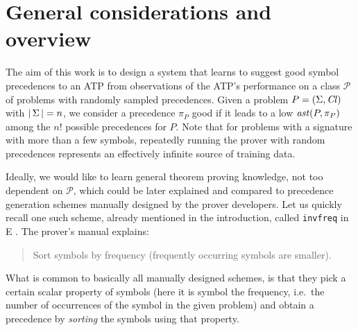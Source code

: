 


\section{General considerations and overview} \label{sect:overview}

The aim of this work is to design a system that learns to suggest good symbol precedences to an ATP 
from observations of the ATP's performance on a class \(\mathcal{P}\) of problems with randomly sampled precedences. 
Given a problem \(P = (\operatorname{\Sigma},\operatorname{\mathit{Cl}})\) with \(|\operatorname{\Sigma}|=n\), we consider a precedence \(\pi_P\) good
if it leads to a low \(\operatorname{\mathit{ast}}(P,\pi_P)\)
among the $n!$ possible precedences for \(P\).
Note that for problems with a signature with more than a few symbols, repeatedly running the prover 
with random precedences represents an effectively infinite source of training data.

Ideally, we would like to learn general theorem proving knowledge, not too dependent on $\mathcal{P}$,
which could be later explained and compared to precedence generation schemes manually designed 
by the prover developers. Let us quickly recall one such scheme, already mentioned in the introduction,
called \texttt{invfreq} in E \cite{SCV:CADE-2019}. The prover's manual \cite{E-manual} explains:
\begin{quote}
Sort symbols by frequency (frequently occurring symbols are smaller).
\end{quote}
What is common to basically all manually designed schemes, is that they pick a certain scalar property of symbols 
(here it is symbol the frequency, i.e.~the number of occurrences of the symbol in the given problem)
and obtain a precedence by \emph{sorting} the symbols using that property.

